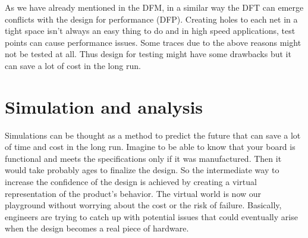 \documentclass[12pt]{article}
\begin{document}








As we have already mentioned in the DFM, in a similar way the DFT can emerge conflicts with the design for performance (DFP). Creating holes to each net in a tight space isn't always an easy thing to do and in high speed applications, test points can cause performance issues. Some traces due to the above reasons might not be tested at all. Thus design for testing might have some drawbacks but it can save a lot of cost in the long run. 





\section{Simulation and analysis}

Simulations can be thought as a method to predict the future that can save a lot of time and cost in the long run. Imagine to be able to know that your board is functional and meets the specifications only if it was manufactured. Then it would take probably ages to finalize the design. So the intermediate way to increase the confidence of the design is achieved by creating a virtual representation of the product's behavior. The virtual world is now our playground without worrying about the cost or the risk of failure. Basically, engineers are trying to catch up with potential issues that could eventually arise when the design becomes a real piece of hardware.
\end{document}
